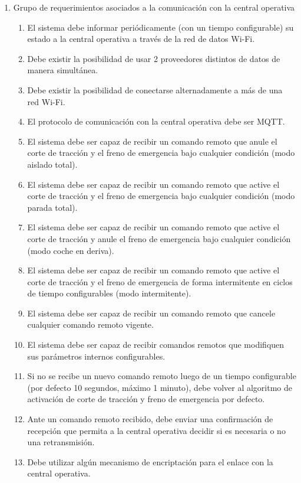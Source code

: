\begin{enumerate}
    \item Grupo de requerimientos asociados a la comunicación con la central operativa
    \begin{enumerate}
        \item El sistema debe informar periódicamente (con un tiempo configurable) su estado a la central operativa a través de la red de datos Wi-Fi.
        \item Debe existir la posibilidad de usar 2 proveedores distintos de datos de manera simultánea.
        \item Debe existir la posibilidad de conectarse alternadamente a más de una red Wi-Fi.
        \item El protocolo de comunicación con la central operativa debe ser MQTT.
        \item El sistema debe ser capaz de recibir un comando remoto que anule el corte de tracción y el freno de emergencia bajo cualquier condición (modo aislado total).
        \item El sistema debe ser capaz de recibir un comando remoto que active el corte de tracción y el freno de emergencia bajo cualquier condición (modo parada total).
        \item El sistema debe ser capaz de recibir un comando remoto que active el corte de tracción y anule el freno de emergencia bajo cualquier condición (modo coche en deriva).
        \item El sistema debe ser capaz de recibir un comando remoto que active el corte de tracción y el freno de emergencia de forma intermitente en ciclos de tiempo configurables (modo intermitente).
        \item El sistema debe ser capaz de recibir un comando remoto que cancele cualquier comando remoto vigente.
        \item El sistema debe ser capaz de recibir comandos remotos que modifiquen sus parámetros internos configurables.
        \item Si no se recibe un nuevo comando remoto luego de un tiempo configurable (por defecto 10 segundos, máximo 1 minuto), debe volver al algoritmo de activación de corte de tracción y freno de emergencia por defecto.
        \item Ante un comando remoto recibido, debe enviar una confirmación de recepción que permita a la central operativa decidir si es necesaria o no una retransmisión.
        \item Debe utilizar algún mecanismo de encriptación para el enlace con la central operativa.
    \end{enumerate}
       

\end{enumerate}
